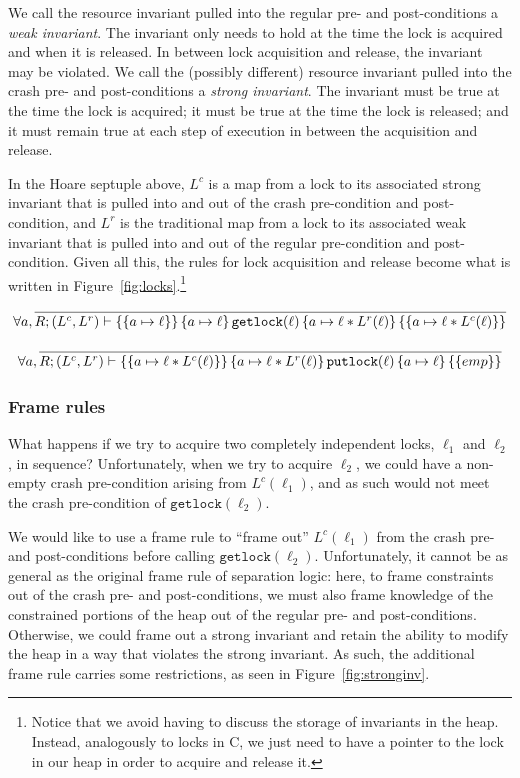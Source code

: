 We call the resource invariant pulled into the regular pre- and post-conditions
a \textit{weak invariant}. The invariant only needs to hold at the time the lock
is acquired and when it is released. In between lock acquisition and release,
the invariant may be violated. We call the (possibly different) resource
invariant pulled into the crash pre- and post-conditions a \textit{strong
invariant}. The invariant must be true at the time the lock is acquired; it must
be true at the time the lock is released; and it must remain true at each step
of execution in between the acquisition and release.

In the Hoare septuple above, $L^c$ is a map from a lock to its associated strong
invariant that is pulled into and out of the crash pre-condition and
post-condition, and $L^r$ is the traditional map from a lock to its associated
weak invariant that is pulled into and out of the regular pre-condition and
post-condition. Given all this, the rules for lock acquisition and release
become what is written in Figure~\ref{fig:locks}.\footnote{Notice that we avoid
having to discuss the storage of invariants in the heap. Instead, analogously
to locks in C, we just need to have a pointer to the lock in our heap in order
to acquire and release it.}

\begin{figure*}
\begin{gather*}
    \forall a, \infer{\hoarestmt{R}{(L^c,L^r)}{a \mapsto \ell}{a \mapsto \ell}{\texttt{getlock}(\ell)}{a \mapsto \ell *
    L^r(\ell)}{a \mapsto \ell * L^c(\ell)}}{} \\[+9px]
    \forall a, \infer{\hoarestmt{R}{(L^c,L^r)}{a \mapsto \ell * L^c(\ell)}{a \mapsto \ell *
    L^r(\ell)}{\texttt{putlock}(\ell)}{a \mapsto \ell}{emp}}{}
\end{gather*}
\caption{Rules for getlock and putlock}
\label{fig:locks}
\end{figure*}

\subsubsection{Frame rules}

What happens if we try to acquire two completely independent locks, $\ell_1$ and
$\ell_2$, in sequence? Unfortunately, when we try to acquire $\ell_2$, we could
have a non-empty crash pre-condition arising from $L^c(\ell_1)$, and as such
would not meet the crash pre-condition of $\texttt{getlock}(\ell_2)$.

We would like to use a frame rule to ``frame out'' $L^c(\ell_1)$ from the crash
pre- and post-conditions before calling $\texttt{getlock}(\ell_2)$.
Unfortunately, it cannot be as general as the original frame rule of separation
logic: here, to frame constraints out of the crash pre- and post-conditions, we
must also frame knowledge of the constrained portions of the heap out of the
regular pre- and post-conditions. Otherwise, we could frame out a strong
invariant and retain the ability to modify the heap in a way that violates the
strong invariant. As such, the additional frame rule carries some restrictions,
as seen in Figure~\ref{fig:stronginv}.

